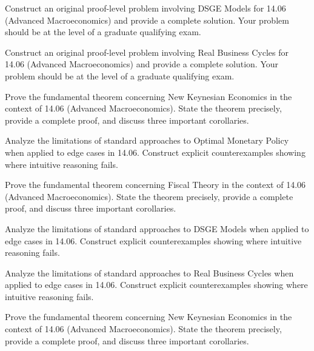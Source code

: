 \documentclass[12pt,a4paper]{exam}
\begin{document}
\begin{questions}

\question[2]
Construct an original proof-level problem involving DSGE Models for 14.06 (Advanced Macroeconomics) and provide a complete solution. Your problem should be at the level of a graduate qualifying exam.

\vspace{0.3cm}

\question[2]
Construct an original proof-level problem involving Real Business Cycles for 14.06 (Advanced Macroeconomics) and provide a complete solution. Your problem should be at the level of a graduate qualifying exam.

\vspace{0.3cm}

\question[5]
Prove the fundamental theorem concerning New Keynesian Economics in the context of 14.06 (Advanced Macroeconomics). State the theorem precisely, provide a complete proof, and discuss three important corollaries.

\vspace{0.3cm}

\question[3]
Analyze the limitations of standard approaches to Optimal Monetary Policy when applied to edge cases in 14.06. Construct explicit counterexamples showing where intuitive reasoning fails.

\vspace{0.3cm}

\question[2]
Prove the fundamental theorem concerning Fiscal Theory in the context of 14.06 (Advanced Macroeconomics). State the theorem precisely, provide a complete proof, and discuss three important corollaries.

\vspace{0.3cm}

\question[6]
Analyze the limitations of standard approaches to DSGE Models when applied to edge cases in 14.06. Construct explicit counterexamples showing where intuitive reasoning fails.

\vspace{0.3cm}

\question[5]
Analyze the limitations of standard approaches to Real Business Cycles when applied to edge cases in 14.06. Construct explicit counterexamples showing where intuitive reasoning fails.

\vspace{0.3cm}

\question[4]
Prove the fundamental theorem concerning New Keynesian Economics in the context of 14.06 (Advanced Macroeconomics). State the theorem precisely, provide a complete proof, and discuss three important corollaries.


\end{questions}
\end{document}
